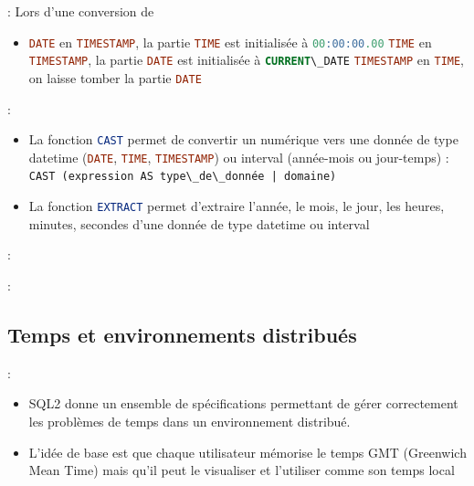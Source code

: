 \documentclass[10pt]{beamer}
\begin{document}
\begin{frame}{\secname : \subsecname}
    Lors d'une conversion de
    \begin{itemize}
        \item \lstinline[language=sql]!DATE! en \lstinline[language=sql]!TIMESTAMP!, la partie \lstinline[language=sql]!TIME! est initialisée à \lstinline[language=sql]!00:00:00.00!
              \lstinline[language=sql]!TIME! en \lstinline[language=sql]!TIMESTAMP!, la partie \lstinline[language=sql]!DATE! est initialisée à \lstinline[language=sql]!CURRENT\_DATE!
              \lstinline[language=sql]!TIMESTAMP! en \lstinline[language=sql]!TIME!, on laisse tomber la partie \lstinline[language=sql]!DATE!
    \end{itemize}
\end{frame}

\begin{frame}{\secname : \subsecname}

    \begin{itemize}
        \item  La fonction \lstinline[language=sql]!CAST! permet de convertir un numérique vers une donnée de type datetime (\lstinline[language=sql]!DATE!, \lstinline[language=sql]!TIME!, \lstinline[language=sql]!TIMESTAMP!) ou interval (année-mois ou jour-temps) : \lstinline[language=bnf]!CAST (expression AS type\_de\_donnée | domaine)!
        \item La fonction \lstinline[language=sql]!EXTRACT! permet d'extraire l'année, le mois, le jour, les heures, minutes, secondes d'une donnée de type datetime ou interval
    \end{itemize}
    
\end{frame}

\begin{frame}{\secname : \subsecname}
    
\end{frame}

\begin{frame}{\secname : \subsecname}
    
\end{frame}

\subsection{Temps et environnements distribués}
\begin{frame}{\secname : \subsecname}
    \begin{itemize}
        \item SQL2 donne un ensemble de spécifications permettant de gérer correctement les problèmes de temps dans un environnement distribué.
        \item L'idée de base est que chaque utilisateur mémorise le temps GMT (Greenwich Mean Time) mais qu'il peut le visualiser et l'utiliser comme son temps local
    \end{itemize}
\end{frame}
\end{document}
